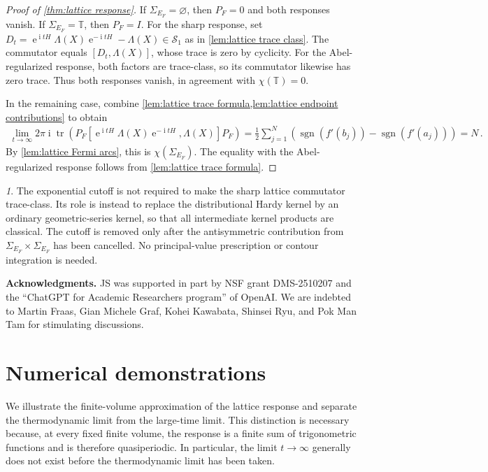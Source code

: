 \documentclass[a4paper,10pt]{article}
\numberwithin{equation}{section}
\theoremstyle{plain}
\theoremstyle{plain}
\theoremstyle{plain}
\theoremstyle{plain}
\theoremstyle{plain}
\theoremstyle{remark}
\newtheorem{rem}[thm]{\protect\remarkname}
\theoremstyle{definition}
\theoremstyle{plain}
\providecommand{\remarkname}{Remark}
\newcommand{\ee}{\operatorname{e}}
\newcommand{\ii}{\operatorname{i}}
\newcommand{\TT}{\mathbb{T}}
\newcommand{\tr}{\operatorname{tr}}
\newcommand{\sgn}{\operatorname{sgn}}
\newcommand{\eq}[1]{\begin{align*}#1\end{align*}}
\begin{document}
\begin{proof}[Proof of \cref{thm:lattice response}]
If $\Sigma_{E_F}=\varnothing$, then $P_F=0$ and both responses vanish. If
$\Sigma_{E_F}=\TT$, then $P_F=I$. For the sharp response, set
$D_t=\ee^{\ii tH}\Lambda(X)\ee^{-\ii tH}-\Lambda(X)\in\mathcal{S}_1$ as in
\cref{lem:lattice trace class}. The commutator equals
$[D_t,\Lambda(X)]$, whose trace is zero by cyclicity. For the Abel-regularized
response, both factors are trace-class, so its commutator likewise has zero
trace. Thus both responses vanish, in agreement with $\chi(\TT)=0$.

In the remaining case, combine
\cref{lem:lattice trace formula,lem:lattice endpoint contributions} to obtain
\eq{\lim_{t\to\infty}
2\pi\ii\tr\left(
P_F\left[
\ee^{\ii tH}\Lambda(X)\ee^{-\ii tH},\Lambda(X)
\right]P_F
\right)
=
\frac{1}{2}\sum_{j=1}^{N}
\left(
\sgn(f'(b_j))-\sgn(f'(a_j))
\right)
=N\,.}
By \cref{lem:lattice Fermi arcs}, this is $\chi(\Sigma_{E_F})$. The equality
with the Abel-regularized response follows from
\cref{lem:lattice trace formula}.
\end{proof}

\begin{rem}
The exponential cutoff is not required to make the sharp lattice
commutator trace-class. Its role is instead to replace the distributional
Hardy kernel by an ordinary geometric-series kernel, so that all intermediate
kernel products are classical. The cutoff is removed only after the
antisymmetric contribution from
$\Sigma_{E_F}\times\Sigma_{E_F}$ has been cancelled. No principal-value
prescription or contour integration is needed.
\end{rem}
 
 
    \bigskip
	\bigskip
	\noindent\textbf{Acknowledgments.} 
JS was supported in part by NSF grant DMS-2510207 and the “ChatGPT for Academic Researchers program” of OpenAI. We are indebted to Martin Fraas, Gian Michele Graf, Kohei Kawabata, Shinsei Ryu, and Pok Man Tam for stimulating discussions.
	\bigskip
	\appendix
\section{Numerical demonstrations}\label{sec:numerics}

We illustrate the finite-volume approximation of the lattice response and
separate the thermodynamic limit from the large-time limit. This distinction
is necessary because, at every fixed finite volume, the response is a finite
sum of trigonometric functions and is therefore quasiperiodic. In particular,
the limit $t\to\infty$ generally does not exist before the thermodynamic limit
has been taken.
\end{document}
